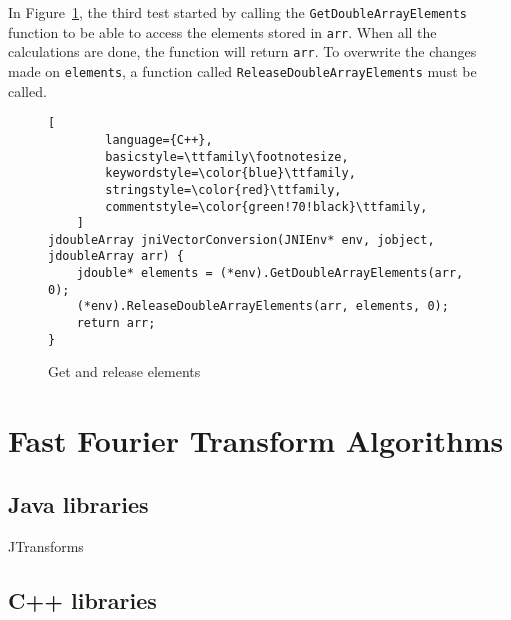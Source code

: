 In Figure~\ref{fig:jni:conversion}, the third test started by calling the \texttt{GetDoubleArrayElements} function to be able to access the elements stored in \texttt{arr}. When all the calculations are done, the function will return \texttt{arr}. To overwrite the changes made on \texttt{elements}, a function called \texttt{ReleaseDoubleArrayElements} must be called.

\begin{figure}
\begin{lstlisting}[
        language={C++},
        basicstyle=\ttfamily\footnotesize,
        keywordstyle=\color{blue}\ttfamily,
        stringstyle=\color{red}\ttfamily,
        commentstyle=\color{green!70!black}\ttfamily,
    ]
jdoubleArray jniVectorConversion(JNIEnv* env, jobject, jdoubleArray arr) {
    jdouble* elements = (*env).GetDoubleArrayElements(arr, 0);
    (*env).ReleaseDoubleArrayElements(arr, elements, 0);
    return arr;
}
\end{lstlisting}
\caption{Get and release elements}
\label{fig:jni:conversion}
\end{figure}

\section{Fast Fourier Transform Algorithms}

\subsection{Java libraries}
JTransforms \cite{jtransforms:benchmark}

\subsection{C++ libraries}
\cite{FFTW05}

